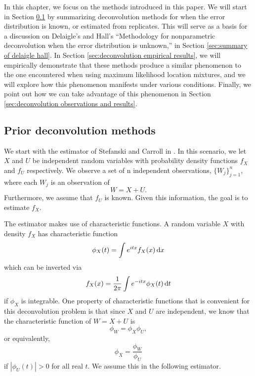 
	In this chapter, we focus on the methods introduced in this paper. We will start in Section \ref{sec:summary of basic deconvolution} by summarizing deconvolution methods for when the error distribution is known, or estimated from replicates. This will serve as a basis for a discussion on Delaigle's and Hall's ``Methodology for nonparametric deconvolution when the error distribution is unknown,'' in Section \ref{sec:summary of delaigle hall}. In Section \ref{sec:deconvolution empirical results}, we will empirically demonstrate that these methods produce a similar phenomenon to the one encountered when using maximum likelihood location mixtures, and we will explore how this phenomenon manifests under various conditions. Finally, we point out how we can take advantage of this phenomenon in Section \ref{sec:deconvolution observations and results}.

\subsection{Prior deconvolution methods}
\label{sec:summary of basic deconvolution}
	We start with the estimator of Stefanski and Carroll in \cite{Stefanski1990-uo}. In this scenario, we let $X$ and $U$ be independent random variables with probability density functions $f_X$ and $f_U$ respectively. We observe a set of n independent observations, $\{W_j\}_{j = 1}^n$, where each $W_j$ is an observation of 
	\begin{equation}
		W = X + U.
	\end{equation}
	Furthermore, we assume that $f_U$ is known. Given this information, the goal is to estimate $f_X$.

	The estimator makes use of characteristic functions. A random variable $X$ with density $f_X$ has characteristic function
	\begin{equation}
		\phi_X(t) = \int e^{i t x} f_X(x) \, \mathrm{d} x
	\end{equation}
	which can be inverted via
	\begin{equation}
		f_X(x) = \frac{1}{2\pi} \int e^{-itx} \phi_X(t) \, \mathrm{d} t
	\end{equation}
	if $\phi_X$ is integrable. One property of characteristic functions that is convenient for this deconvolution problem is that since $X$ and $U$ are independent, we know that the characteristic function of $W = X+ U$ is
	\begin{equation}
		\phi_W = \phi_X \phi_U,
	\end{equation}
	or equivalently,
	\begin{equation}
		\phi_X = \frac{\phi_W}{\phi_U}
		\label{eq: phi_X is fraction phi_W phi_U}
	\end{equation}
	if $|\phi_U(t)| > 0$ for all real $t$. We assume this in the following estimator.

